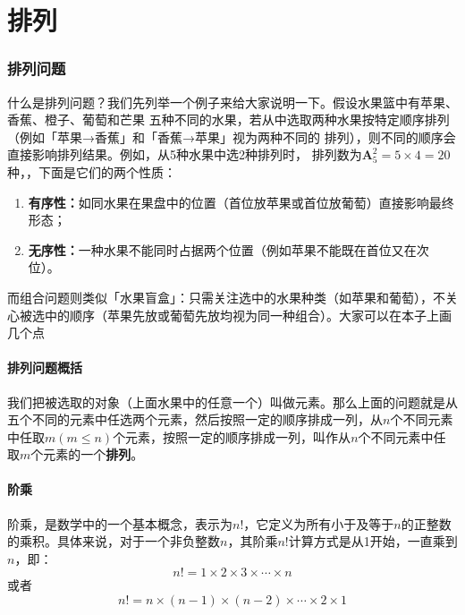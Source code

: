 \part{\textbf{排列}}

\section{排列问题}

什么是排列问题？我们先列举一个例子来给大家说明一下。假设水果篮中有苹果、香蕉、橙子、葡萄和芒果
五种不同的水果，若从中选取两种水果按特定顺序排列（例如「苹果→香蕉」和「香蕉→苹果」视为两种不同的
排列），则不同的顺序会直接影响排列结果。例如，从5种水果中选2种排列时，
排列数为$\textbf{A}_{5}^2 = 5 \times 4 = 20$种，，下面是它们的两个性质：

\begin{enumerate}
    \item \textbf{有序性：}如同水果在果盘中的位置（首位放苹果或首位放葡萄）直接影响最终形态；
    \item \textbf{无序性：}一种水果不能同时占据两个位置（例如苹果不能既在首位又在次位）。
\end{enumerate}

而组合问题则类似「水果盲盒」：只需关注选中的水果种类（如苹果和葡萄），不关心被选中的顺序（苹果先放或葡萄先放均视为同一种组合）。大家可以在本子上画几个点

\subsection{排列问题概括}

我们把被选取的对象（上面水果中的任意一个）叫做元素。那么上面的问题就是从五个不同的元素中任选两个元素，然后按照一定的顺序排成一列，从$\mathit{n}$个不同元素中任取$m(m \le n)$个元素，按照一定的顺序排成一列，叫作从$\mathit{n}$个不同元素中任取$\mathit{m}$个元素的一个\textbf{排列}。

\subsection{阶乘}\label{sec:factorial}
阶乘，是数学中的一个基本概念，表示为$n!$，它定义为所有小于及等于$n$的正整数的乘积。具体来说，对于一个非负整数$n$，其阶乘$n!$计算方式是从1开始，一直乘到$n$，即：
\begin{equation*}
    n! = 1 \times 2 \times 3 \times \cdots \times n
\end{equation*}
或者
\begin{equation*}
    n! = n \times (n-1) \times (n-2) \times \cdots \times 2 \times 1
\end{equation*}

